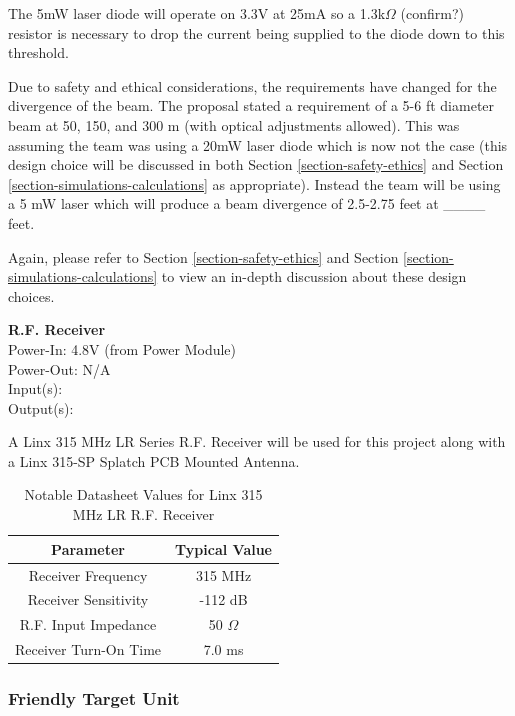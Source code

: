 \documentclass[letterpaper,10pt]{article}
\begin{document}
\begin{spacing}{1.15}
The 5mW laser diode will operate on 3.3V at 25mA so a 1.3k$\Omega$ (confirm?) resistor is necessary to drop the current being supplied to the diode down to this threshold. 

Due to safety and ethical considerations, the requirements have changed for the divergence of the beam. The proposal stated a requirement of a 5-6 ft diameter beam at 50, 150, and 300 m (with optical adjustments allowed). This was assuming the team was using a 20mW laser diode which is now not the case (this design choice will  be discussed in both Section \ref{section-safety-ethics} and Section \ref{section-simulations-calculations} as appropriate). Instead the team will be using a 5 mW laser which will produce a beam divergence of 2.5-2.75 feet at \_\_\_\_ feet. 

Again, please refer to Section \ref{section-safety-ethics} and Section \ref{section-simulations-calculations} to view an in-depth discussion about these design choices.

\normalsize\textbf{R.F. Receiver} \\
Power-In: 4.8V (from Power Module) \\
Power-Out: N/A \\
Input(s): \\
Output(s):

A Linx 315 MHz LR Series R.F. Receiver will be used for this project along with a Linx 315-SP Splatch PCB Mounted Antenna.

\begin{table}[htbp]
	\centering
	\begin{tabular}{c|c}	%
		\toprule	%
		Parameter & Typical Value \\
		\midrule
		Receiver Frequency & 315 MHz \\ 
		Receiver Sensitivity & -112 dB \\
		R.F. Input Impedance & 50 $\Omega$ \\
		Receiver Turn-On Time & 7.0 ms  \\
		\bottomrule	%
	\end{tabular}%
	\caption{Notable Datasheet Values for Linx 315 MHz LR R.F. Receiver}
	\label{tab:table2}	%
\end{table}%


\subsubsection{Friendly Target Unit}


\end{spacing}
\end{document}
